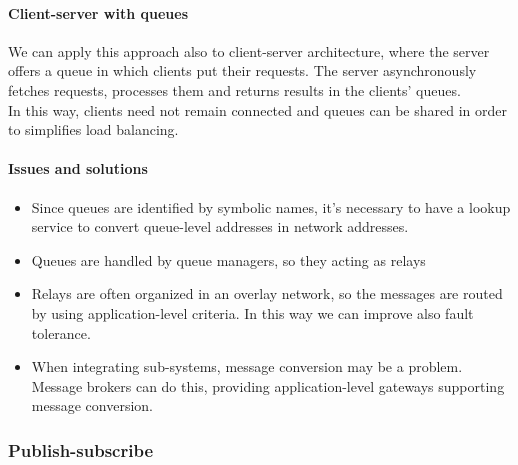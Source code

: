\paragraph{Client-server with queues}

We can apply this approach also to client-server architecture, where the server offers a queue in which clients put their requests. The server asynchronously fetches requests, processes them and returns results in the clients' queues.\\
In this way, clients need not remain connected and queues can be shared in order to simplifies load balancing.

\paragraph{Issues and solutions}

\begin{itemize}
    \item  Since queues are identified by symbolic names, it's necessary to have a lookup service to convert queue-level addresses in network addresses.
    \item Queues are handled by queue managers, so they acting as relays
    \item Relays are often organized in an overlay network, so the messages are routed by using application-level criteria. In this way we can improve also fault tolerance.
    \item When integrating sub-systems, message conversion may be a problem. Message brokers can do this, providing application-level gateways supporting message conversion.
\end{itemize}

\subsubsection{Publish-subscribe}


